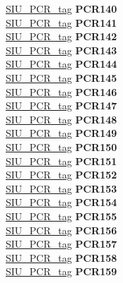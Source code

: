 \begin{DoxyCompactItemize}
\begin{tabbing}
\>\>\mbox{\hyperlink{unionSIU__tag_1_1SIU__PCR__tag}{SIU\_PCR\_tag}} {\bfseries PCR140}\\
\>\>\mbox{\hyperlink{unionSIU__tag_1_1SIU__PCR__tag}{SIU\_PCR\_tag}} {\bfseries PCR141}\\
\>\>\mbox{\hyperlink{unionSIU__tag_1_1SIU__PCR__tag}{SIU\_PCR\_tag}} {\bfseries PCR142}\\
\>\>\mbox{\hyperlink{unionSIU__tag_1_1SIU__PCR__tag}{SIU\_PCR\_tag}} {\bfseries PCR143}\\
\>\>\mbox{\hyperlink{unionSIU__tag_1_1SIU__PCR__tag}{SIU\_PCR\_tag}} {\bfseries PCR144}\\
\>\>\mbox{\hyperlink{unionSIU__tag_1_1SIU__PCR__tag}{SIU\_PCR\_tag}} {\bfseries PCR145}\\
\>\>\mbox{\hyperlink{unionSIU__tag_1_1SIU__PCR__tag}{SIU\_PCR\_tag}} {\bfseries PCR146}\\
\>\>\mbox{\hyperlink{unionSIU__tag_1_1SIU__PCR__tag}{SIU\_PCR\_tag}} {\bfseries PCR147}\\
\>\>\mbox{\hyperlink{unionSIU__tag_1_1SIU__PCR__tag}{SIU\_PCR\_tag}} {\bfseries PCR148}\\
\>\>\mbox{\hyperlink{unionSIU__tag_1_1SIU__PCR__tag}{SIU\_PCR\_tag}} {\bfseries PCR149}\\
\>\>\mbox{\hyperlink{unionSIU__tag_1_1SIU__PCR__tag}{SIU\_PCR\_tag}} {\bfseries PCR150}\\
\>\>\mbox{\hyperlink{unionSIU__tag_1_1SIU__PCR__tag}{SIU\_PCR\_tag}} {\bfseries PCR151}\\
\>\>\mbox{\hyperlink{unionSIU__tag_1_1SIU__PCR__tag}{SIU\_PCR\_tag}} {\bfseries PCR152}\\
\>\>\mbox{\hyperlink{unionSIU__tag_1_1SIU__PCR__tag}{SIU\_PCR\_tag}} {\bfseries PCR153}\\
\>\>\mbox{\hyperlink{unionSIU__tag_1_1SIU__PCR__tag}{SIU\_PCR\_tag}} {\bfseries PCR154}\\
\>\>\mbox{\hyperlink{unionSIU__tag_1_1SIU__PCR__tag}{SIU\_PCR\_tag}} {\bfseries PCR155}\\
\>\>\mbox{\hyperlink{unionSIU__tag_1_1SIU__PCR__tag}{SIU\_PCR\_tag}} {\bfseries PCR156}\\
\>\>\mbox{\hyperlink{unionSIU__tag_1_1SIU__PCR__tag}{SIU\_PCR\_tag}} {\bfseries PCR157}\\
\>\>\mbox{\hyperlink{unionSIU__tag_1_1SIU__PCR__tag}{SIU\_PCR\_tag}} {\bfseries PCR158}\\
\>\>\mbox{\hyperlink{unionSIU__tag_1_1SIU__PCR__tag}{SIU\_PCR\_tag}} {\bfseries PCR159}\\

\end{tabbing}
\end{DoxyCompactItemize}

